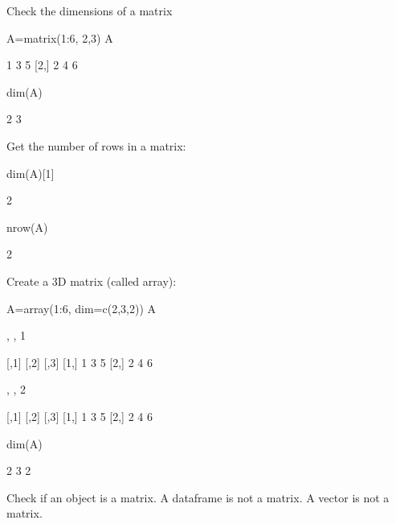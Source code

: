 Check the dimensions of a matrix
\begin{Schunk}
\begin{Sinput}
 A=matrix(1:6, 2,3)
 A
\end{Sinput}
\begin{Soutput}
     [,1] [,2] [,3]
[1,]    1    3    5
[2,]    2    4    6
\end{Soutput}
\begin{Sinput}
 dim(A)
\end{Sinput}
\begin{Soutput}
[1] 2 3
\end{Soutput}
\end{Schunk}
Get the number of rows in a matrix:
\begin{Schunk}
\begin{Sinput}
 dim(A)[1]
\end{Sinput}
\begin{Soutput}
[1] 2
\end{Soutput}
\begin{Sinput}
 nrow(A)
\end{Sinput}
\begin{Soutput}
[1] 2
\end{Soutput}
\end{Schunk}
Create a 3D matrix (called array):
\begin{Schunk}
\begin{Sinput}
 A=array(1:6, dim=c(2,3,2))
 A
\end{Sinput}
\begin{Soutput}
, , 1

     [,1] [,2] [,3]
[1,]    1    3    5
[2,]    2    4    6

, , 2

     [,1] [,2] [,3]
[1,]    1    3    5
[2,]    2    4    6
\end{Soutput}
\begin{Sinput}
 dim(A)
\end{Sinput}
\begin{Soutput}
[1] 2 3 2
\end{Soutput}
\end{Schunk}
Check if an object is a matrix.  A dataframe is not a matrix.  A vector is not a matrix.
